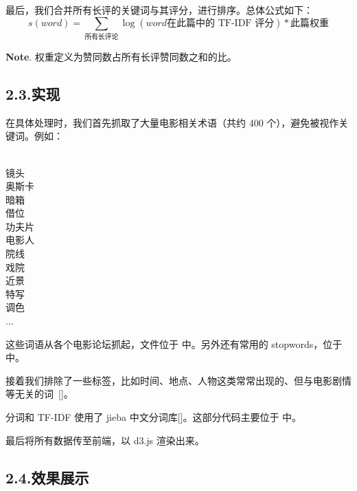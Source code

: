 \documentclass[10pt]{article}
\begin{document}
最后，我们合并所有长评的关键词与其评分，进行排序。总体公式如下：%
\label{score}%
\noindent{}
\noindent\[%
s(word) = \sum_{\text{所有长评论}}{\log{(word \text{在此篇中的 TF-IDF 评分})} * \text{此篇权重}}
\]%

\noindent{}\textbf{Note}.
权重定义为赞同数占所有长评赞同数之和的比。%

\subsection{2.3.\hspace*{0.5em}实现}\label{section}%

\noindent{}在具体处理时，我们首先抓取了大量电影相关术语（共约 400 个），避免被视作关键词。例如：%
\begin{mdpre}%
\\
镜头\\
奥斯卡\\
暗箱\\
借位\\
功夫片\\
电影人\\
院线\\
戏院\\
近景\\
特写\\
调色\\
...%
\end{mdpre}\noindent{}这些词语从各个电影论坛抓起，文件位于  中。另外还有常用的 stopwords，位于  中。

接着我们排除了一些标签，比如时间、地点、人物这类常常出现的、但与电影剧情等无关的词~[]。%

分词和 TF-IDF 使用了 jieba 中文分词库[]。这部分代码主要位于  中。%

最后将所有数据传至前端，以 d3.js 渲染出来。%

\subsection{2.4.\hspace*{0.5em}效果展示}\label{section}%
\end{document}
